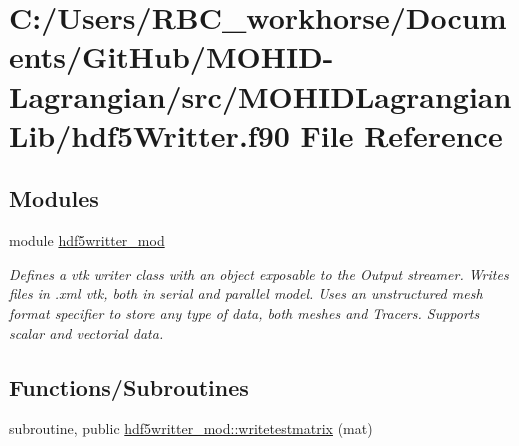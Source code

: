 \hypertarget{hdf5_writter_8f90}{}\section{C\+:/\+Users/\+R\+B\+C\+\_\+workhorse/\+Documents/\+Git\+Hub/\+M\+O\+H\+I\+D-\/\+Lagrangian/src/\+M\+O\+H\+I\+D\+Lagrangian\+Lib/hdf5\+Writter.f90 File Reference}
\label{hdf5_writter_8f90}
\subsection*{Modules}
\begin{DoxyCompactItemize}
\item 
module \mbox{\hyperlink{namespacehdf5writter__mod}{hdf5writter\+\_\+mod}}
\begin{DoxyCompactList}\small\item\em Defines a vtk writer class with an object exposable to the Output streamer. Writes files in .xml vtk, both in serial and parallel model. Uses an unstructured mesh format specifier to store any type of data, both meshes and Tracers. Supports scalar and vectorial data. \end{DoxyCompactList}\end{DoxyCompactItemize}
\subsection*{Functions/\+Subroutines}
\begin{DoxyCompactItemize}
\item 
subroutine, public \mbox{\hyperlink{namespacehdf5writter__mod_a365615aa2f72e08015a020475c37a6c8}{hdf5writter\+\_\+mod\+::writetestmatrix}} (mat)
\end{DoxyCompactItemize}
